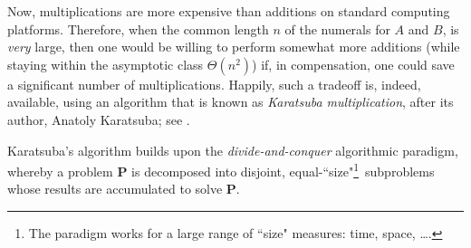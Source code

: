 \begin{enumerate}
\smallskip

Now, multiplications are more expensive than additions on standard computing platforms.  Therefore, when the common length $n$ of the numerals for $A$ and $B$, is {\em very} large, then one would be willing to perform somewhat more additions (while staying within the asymptotic class $\Theta(n^2)$) if, in compensation, one could save a significant number of multiplications.  Happily, such a tradeoff is, indeed, available, using an algorithm that is known as {\it Karatsuba multiplication}, after its author, Anatoly Karatsuba; see \cite{KaratsubaO62}.

\medskip

Karatsuba's algorithm builds upon the {\it divide-and-conquer} algorithmic paradigm, whereby a
problem {\bf P} is decomposed into disjoint, equal-``size"\footnote{The paradigm works for a large range of ``size" measures: time, space, \ldots.}~subproblems whose results are accumulated to solve {\bf P}.


\bigskip

\noindent {}
\bigskip


\end{enumerate}
